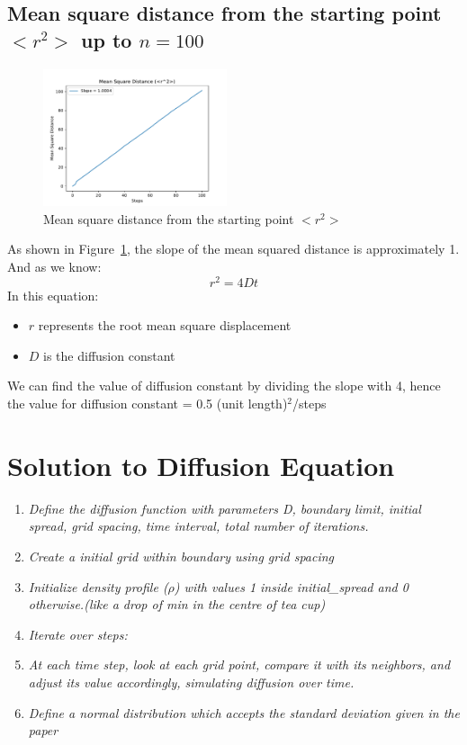 \documentclass[11pt]{article}
\begin{document}
\subsection{Mean square distance from the starting point  $<r^2>$ up to $n = 100$}
\begin{figure}[H]
    \centering
    \includegraphics[width=0.48\textwidth, keepaspectratio]{(<r^2>).pdf}
    \caption{Mean square distance from the starting point  $<r^2>$}
    \label{fig:19}
\end{figure}
As shown in Figure~\ref{fig:19}, the slope of the mean squared distance is approximately 1. And as we know: 
\begin{equation}
    r^2 = 4Dt
\end{equation}
In this equation:
\begin{itemize}
    \item \( r \) represents the root mean square displacement
    \item \( D \) is the diffusion constant
\end{itemize}
We can find the value of diffusion constant by dividing the slope with 4, hence the value for diffusion constant = 0.5 (unit length)$^2$/steps

\section{Solution to Diffusion Equation}
\begin{enumerate}
    \item \textit{Define the diffusion function with parameters D, boundary limit, initial spread, grid spacing, time interval, total number of iterations.}
    \item \textit{Create a initial grid within boundary using grid spacing}
    \item \textit{Initialize density profile (\( \rho \)) with values 1 inside initial\_spread and 0 otherwise.(like a drop of min in the centre of tea cup)}
    \item \textit{Iterate over steps:}
    \item \textit{At each time step, look at each grid point, compare it with its neighbors, and adjust its value accordingly, simulating diffusion over time.}
    \item \textit{Define a normal distribution which accepts the standard deviation given in the paper}
\end{enumerate}
\end{document}
